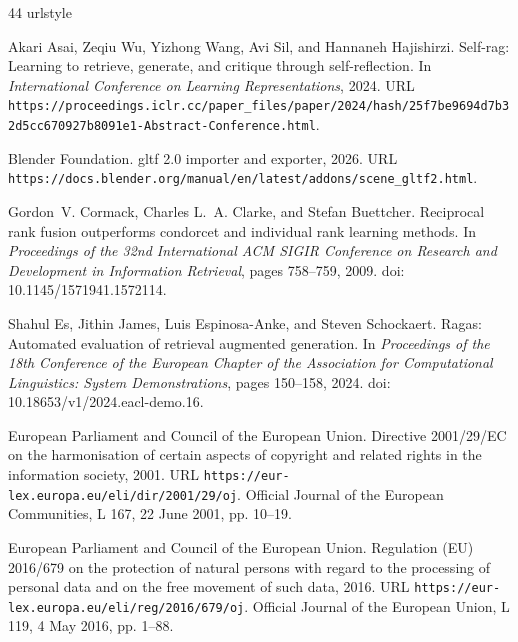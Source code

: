 \begin{thebibliography}{44}
\providecommand{\natexlab}[1]{#1}
\providecommand{\url}[1]{\texttt{#1}}
\expandafter\ifx\csname urlstyle\endcsname\relax
  \providecommand{\doi}[1]{doi: #1}\else
  \providecommand{\doi}{doi: \begingroup \urlstyle{rm}\Url}\fi

Akari Asai, Zeqiu Wu, Yizhong Wang, Avi Sil, and Hannaneh Hajishirzi.
\newblock Self-rag: Learning to retrieve, generate, and critique through
  self-reflection.
\newblock In \emph{International Conference on Learning Representations}, 2024.
\newblock URL
  \url{https://proceedings.iclr.cc/paper_files/paper/2024/hash/25f7be9694d7b32d5cc670927b8091e1-Abstract-Conference.html}.

{Blender Foundation}.
\newblock gltf 2.0 importer and exporter, 2026.
\newblock URL
  \url{https://docs.blender.org/manual/en/latest/addons/scene_gltf2.html}.

Gordon~V. Cormack, Charles L.~A. Clarke, and Stefan Buettcher.
\newblock Reciprocal rank fusion outperforms condorcet and individual rank
  learning methods.
\newblock In \emph{Proceedings of the 32nd International ACM SIGIR Conference
  on Research and Development in Information Retrieval}, pages 758--759, 2009.
\newblock \doi{10.1145/1571941.1572114}.

Shahul Es, Jithin James, Luis Espinosa-Anke, and Steven Schockaert.
\newblock Ragas: Automated evaluation of retrieval augmented generation.
\newblock In \emph{Proceedings of the 18th Conference of the European Chapter
  of the Association for Computational Linguistics: System Demonstrations},
  pages 150--158, 2024.
\newblock \doi{10.18653/v1/2024.eacl-demo.16}.

{European Parliament and Council of the European Union}.
\newblock Directive 2001/29/{EC} on the harmonisation of certain aspects of
  copyright and related rights in the information society, 2001.
\newblock URL \url{https://eur-lex.europa.eu/eli/dir/2001/29/oj}.
\newblock Official Journal of the European Communities, L 167, 22 June 2001,
  pp. 10--19.

{European Parliament and Council of the European Union}.
\newblock Regulation ({EU}) 2016/679 on the protection of natural persons with
  regard to the processing of personal data and on the free movement of such
  data, 2016.
\newblock URL \url{https://eur-lex.europa.eu/eli/reg/2016/679/oj}.
\newblock Official Journal of the European Union, L 119, 4 May 2016, pp. 1--88.


\end{thebibliography}
